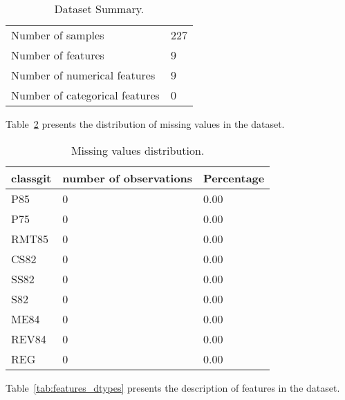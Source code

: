 \documentclass{article}%
\begin{document}
\begin{table}[H]%
\begin{center}%
\renewcommand{\arraystretch}{1.5}%
\begin{tabular}{l l}%
\hline%
Number of samples&227\\%
Number of features&9\\%
Number of numerical features&9\\%
Number of categorical features&0\\%
\hline%
\end{tabular}%
\end{center}%
\caption{Dataset Summary.}%
\label{tab:dataset_summary}%
\end{table}

%
Table~\ref{tab:missing_values} %
presents the distribution of missing values in the dataset.%


\begin{table}[H]%
\begin{center}%
\renewcommand{\arraystretch}{1.5}%
\begin{tabular}{l l l}%
\hline%
\textbf{classgit}&\textbf{number of observations}&\textbf{Percentage}\\%
\hline%
P85&0&0.00\\%
P75&0&0.00\\%
RMT85&0&0.00\\%
CS82&0&0.00\\%
SS82&0&0.00\\%
S82&0&0.00\\%
ME84&0&0.00\\%
REV84&0&0.00\\%
REG&0&0.00\\%
\hline%
\end{tabular}%
\end{center}%
\caption{Missing values distribution.}%
\label{tab:missing_values}%
\end{table}

%
Table~\ref{tab:features_dtypes} %
presents the description of features in the dataset.%
\end{document}
